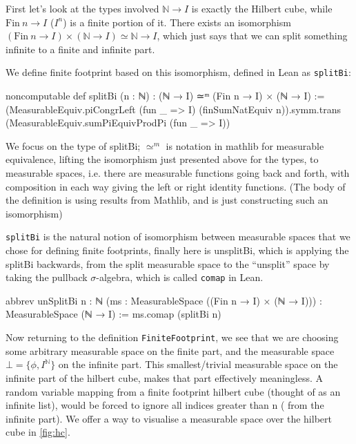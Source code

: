 First let's look at the types involved $\mathbb{N} \to I$ is exactly the Hilbert cube, while $\mathrm{Fin}\ n \to I$ ($I^n$) is a finite portion of it.
There exists an isomorphism $(\mathrm{Fin}\ n \to I) \times (\mathbb{N} \to I) \simeq \mathbb{N} \to I$, which just says that we can split something infinite to a
finite and infinite part.

We define finite footprint based on this isomorphism, defined in Lean as \texttt{splitBi}:

\begin{leancode}
noncomputable def splitBi (n : ℕ) : (ℕ → I) ≃ᵐ (Fin n → I) × (ℕ → I) :=
  (MeasurableEquiv.piCongrLeft (fun _ => I) (finSumNatEquiv n)).symm.trans
  (MeasurableEquiv.sumPiEquivProdPi (fun _ => I))
\end{leancode}

We focus on the type of splitBi; $\simeq^m$ is notation in mathlib for measurable equivalence, lifting the isomorphism just presented above for the types,
to measurable spaces, i.e. there are measurable functions going back and forth, with composition in each way giving the left or right identity functions.
(The body of the definition is using results from Mathlib, and is just constructing such an isomorphism)

\texttt{splitBi} is the natural notion of isomorphism between measurable spaces that we chose for defining finite footprints, finally here is unsplitBi,
which is applying the splitBi backwards, from the split measurable space to the ``unsplit'' space by taking the pullback $\sigma$-algebra, which is called \texttt{comap}
in Lean.

\begin{leancode}
abbrev unSplitBi {n : ℕ} (ms : MeasurableSpace ((Fin n → I) × (ℕ → I)))
    : MeasurableSpace (ℕ → I) := ms.comap (splitBi n)
\end{leancode}

Now returning to the definition \texttt{FiniteFootprint}, we see that we are choosing some arbitrary measurable space on the finite part, and the
measurable space $\bot = \{\phi, I^\mathbb{N}\}$ on the infinite part. This smallest/trivial measurable space on the infinite part of the hilbert
cube, makes that part effectively meaningless. A random variable mapping from a finite footprint hilbert cube (thought of as an infinite list),
would be forced to ignore all indices greater than n (
from the infinite part). We offer a way to visualise a measurable space over the hilbert cube in \ref{fig:hc}.


